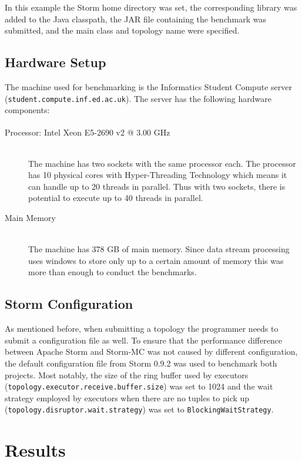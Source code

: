 \documentclass[bsc,logo,frontabs,twoside,singlespacing,normalheadings,parskip]{infthesis}\usepackage[]{graphicx}\usepackage[]{color}
\begin{document}
In this example the Storm home directory was set, the corresponding library was added to the Java classpath, the JAR file containing the benchmark was submitted, and the main class and topology name were specified.

\subsection{Hardware Setup}

The machine used for benchmarking is the Informatics Student Compute server (\texttt{student.compute.inf.ed.ac.uk}). The server has the following hardware components:

\begin{description}
	\item[Processor: Intel\textsuperscript{\textregistered} Xeon\textsuperscript{\textregistered} E5-2690 v2 @ 3.00 GHz] \hfill \\
	The machine has two sockets with the same processor each. The processor has 10 physical cores with Hyper-Threading Technology which means it can handle up to 20 threads in parallel. Thus with two sockets, there is potential to execute up to 40 threads in parallel.
	\item[Main Memory] \hfill \\
	The machine has 378 GB of main memory. Since data stream processing uses windows to store only up to a certain amount of memory this was more than enough to conduct the benchmarks.
\end{description}

\subsection{Storm Configuration}

As mentioned before, when submitting a topology the programmer needs to submit a configuration file as well. To ensure that the performance difference between Apache Storm and Storm-MC was not caused by different configuration, the default configuration file from Storm 0.9.2 was used to benchmark both projects. Most notably, the size of the ring buffer used by executors \\ (\texttt{topology.executor.receive.buffer.size}) was set to 1024 and the wait strategy employed by executors when there are no tuples to pick up \\ (\texttt{topology.disruptor.wait.strategy}) was set to \texttt{BlockingWaitStrategy}.

\section{Results}
\label{sec:performance}
\end{document}
